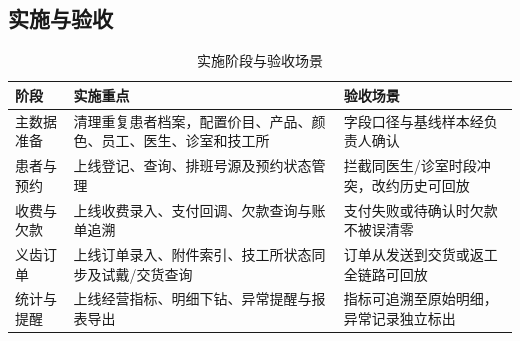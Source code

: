 \documentclass[UTF8,a4paper,12pt,fontset=fandol]{ctexart}
\begin{document}
\subsection{实施与验收}
\begin{table}[H]
\centering
\caption{实施阶段与验收场景}
\begin{tabularx}{\textwidth}{L{2.3cm}Y Y}
\toprule
阶段 & 实施重点 & 验收场景 \\
\midrule
主数据准备 & 清理重复患者档案，配置价目、产品、颜色、员工、医生、诊室和技工所 & 字段口径与基线样本经负责人确认 \\
患者与预约 & 上线登记、查询、排班号源及预约状态管理 & 拦截同医生/诊室时段冲突，改约历史可回放 \\
收费与欠款 & 上线收费录入、支付回调、欠款查询与账单追溯 & 支付失败或待确认时欠款不被误清零 \\
义齿订单 & 上线订单录入、附件索引、技工所状态同步及试戴/交货查询 & 订单从发送到交货或返工全链路可回放 \\
统计与提醒 & 上线经营指标、明细下钻、异常提醒与报表导出 & 指标可追溯至原始明细，异常记录独立标出 \\
\bottomrule
\end{tabularx}
\end{table}


\end{document}
